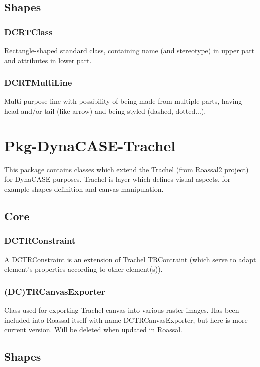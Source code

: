 \documentclass[a4paper,10pt,twoside]{book}
\begin{document}
\section{ Shapes}\subsection{ DCRTClass}
Rectangle-shaped standard class, containing name (and stereotype) in upper part and attributes in lower part.
\subsection{ DCRTMultiLine}
Multi-purpose line with possibility of being made from multiple parts, having head and$/$or tail (like arrow) and being styled (dashed, dotted...).
\chapter{ Pkg-DynaCASE-Trachel}
This package contains classes which extend the Trachel (from Roassal2 project) for DynaCASE purposes.
Trachel is layer which defines visual aspects, for example shapes definition and canvas manipulation.
\section{ Core}\subsection{ DCTRConstraint}
A DCTRConstraint is an extension of Trachel TRContraint (which serve to adapt element's properties according to other element(s)).
\subsection{ (DC)TRCanvasExporter}
Class used for exporting Trachel canvas into various raster images.
Has been included into Roassal itself with name DCTRCanvasExporter, but here is more current version. Will be deleted when updated in Roassal.
\section{ Shapes}




\printindex
\end{document}
